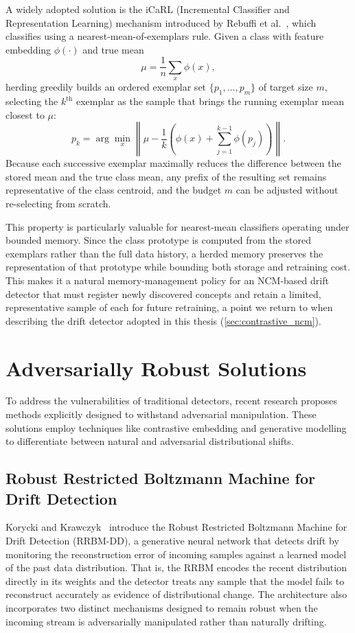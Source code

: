 A widely adopted solution is the iCaRL (Incremental Classifier and Representation Learning) mechanism introduced by Rebuffi et al.~\cite{Rebuffi_2017}, which classifies using a nearest-mean-of-exemplars rule. Given a class with feature embedding $\phi(\cdot)$ and true mean
\begin{equation}
    \mu = \frac{1}{n}\sum_{x} \phi(x),
\end{equation}
herding greedily builds an ordered exemplar set $\{p_1, \dots, p_m\}$ of target size $m$, selecting the $k^{\text{th}}$ exemplar as the sample that brings the running exemplar mean closest to $\mu$:
\begin{equation} \label{eq:herding}
    p_k = \arg\min_{x} \left\| \mu - \frac{1}{k}\left( \phi(x) + \sum_{j=1}^{k-1} \phi(p_j) \right) \right\|.
\end{equation}
Because each successive exemplar maximally reduces the difference between the stored mean and the true class mean, any prefix of the resulting set remains representative of the class centroid, and the budget $m$ can be adjusted without re-selecting from scratch.

This property is particularly valuable for nearest-mean classifiers operating under bounded memory. Since the class prototype is computed from the stored exemplars rather than the full data history, a herded memory preserves the representation of that prototype while bounding both storage and retraining cost. This makes it a natural memory-management policy for an NCM-based drift detector that must register newly discovered concepts and retain a limited, representative sample of each for future retraining, a point we return to when describing the drift detector adopted in this thesis (\cref{sec:contrastive_ncm}).


\section{Adversarially Robust Solutions}
\label{sec:robust solutions}
To address the vulnerabilities of traditional detectors, recent research proposes methods explicitly designed to withstand adversarial manipulation. These solutions employ techniques like contrastive embedding and generative modelling to differentiate between natural and adversarial distributional shifts.

\subsection{Robust Restricted Boltzmann Machine for Drift Detection}
\label{sec:rrbm-dd}
Korycki and Krawczyk~\cite{Korycki_2022} introduce the Robust Restricted Boltzmann Machine for Drift Detection (RRBM-DD), a generative neural network that detects drift by monitoring the reconstruction error of incoming samples against a learned model of the past data distribution. That is, the RRBM encodes the recent distribution directly in its weights and the detector treats any sample that the model fails to reconstruct accurately as evidence of distributional change. The architecture also incorporates two distinct mechanisms designed to remain robust when the incoming stream is adversarially manipulated rather than naturally drifting.

